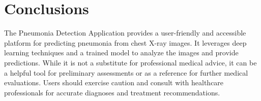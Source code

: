 \section{Conclusions}

The Pneumonia Detection Application provides a user-friendly and accessible platform for predicting pneumonia from chest X-ray images. It leverages deep learning techniques and a trained model to analyze the images and provide predictions. While it is not a substitute for professional medical advice, it can be a helpful tool for preliminary assessments or as a reference for further medical evaluations. Users should exercise caution and consult with healthcare professionals for accurate diagnoses and treatment recommendations.

